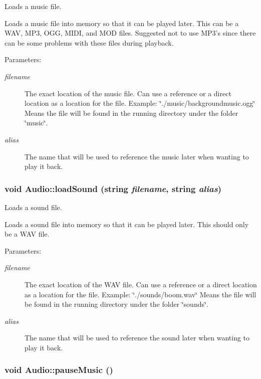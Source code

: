 Loads a music file. 

Loads a music file into memory so that it can be played later. This can be a WAV, MP3, OGG, MIDI, and MOD files. Suggested not to use MP3's since there can be some problems with these files during playback. \begin{Desc}
\item[Parameters:]
\begin{description}
\item[{\em filename}]The exact location of the music file. Can use a reference or a direct location as a location for the file. Example: \char`\"{}./music/backgroundmusic.ogg\char`\"{} Means the file will be found in the running directory under the folder \char`\"{}music\char`\"{}. \item[{\em alias}]The name that will be used to reference the music later when wanting to play it back. \end{description}
\end{Desc}
\hypertarget{class_audio_5a9d44cfe20149b5266ec38c05b80134}{
\subsubsection[{loadSound}]{\setlength{\rightskip}{0pt plus 5cm}void Audio::loadSound (string {\em filename}, \/  string {\em alias})}}
\label{class_audio_5a9d44cfe20149b5266ec38c05b80134}


Loads a sound file. 

Loads a sound file into memory so that it can be played later. This should only be a WAV file. \begin{Desc}
\item[Parameters:]
\begin{description}
\item[{\em filename}]The exact location of the WAV file. Can use a reference or a direct location as a location for the file. Example: \char`\"{}./sounds/boom.wav\char`\"{} Means the file will be found in the running directory under the folder \char`\"{}sounds\char`\"{}. \item[{\em alias}]The name that will be used to reference the sound later when wanting to play it back. \end{description}
\end{Desc}
\hypertarget{class_audio_8903a4e19354aa20cee9bbe10eb98004}{
\subsubsection[{pauseMusic}]{\setlength{\rightskip}{0pt plus 5cm}void Audio::pauseMusic ()}}
\label{class_audio_8903a4e19354aa20cee9bbe10eb98004}


